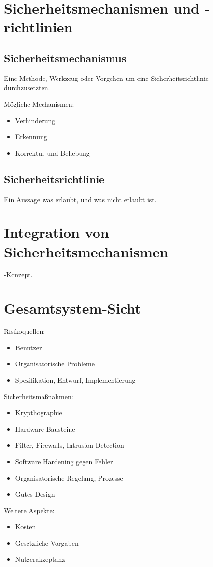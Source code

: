 \section{Sicherheitsmechanismen und -richtlinien}
\subsection{Sicherheitsmechanismus}
Eine Methode, Werkzeug oder Vorgehen um eine Sicherheitsrichtlinie durchzusetzten.

Mögliche Mechanismen:
\begin{itemize}
    \item Verhinderung
    \item Erkennung
    \item Korrektur und Behebung
\end{itemize}

\subsection{Sicherheitsrichtlinie}
Ein Aussage was erlaubt, und was nicht erlaubt ist.

\section{Integration von Sicherheitsmechanismen}
-Konzept.

\section{Gesamtsystem-Sicht}
Risikoquellen:
\begin{itemize}
    \item Benutzer
    \item Organisatorische Probleme
    \item Spezifikation, Entwurf, Implementierung
\end{itemize}

Sicherheitsmaßnahmen:
\begin{itemize}
    \item Krypthographie
    \item Hardware-Bausteine
    \item Filter, Firewalls, Intrusion Detection
    \item Software Hardening gegen Fehler
    \item Organisatorische Regelung, Prozesse
    \item Gutes Design
\end{itemize}

Weitere Aspekte:
\begin{itemize}
    \item Kosten
    \item Gesetzliche Vorgaben
    \item Nutzerakzeptanz
\end{itemize}
